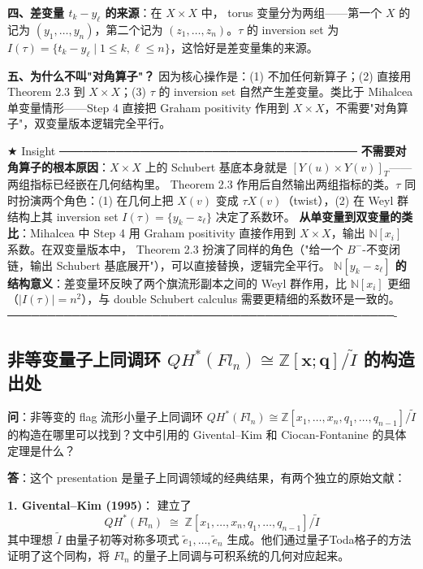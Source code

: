 \textbf{四、差变量 $t_k - y_\ell$ 的来源}：在 $X \times X$ 中， torus 变量分为两组——第一个 $X$ 的记为 $(y_1,\ldots,y_n)$，第二个记为 $(z_1,\ldots,z_n)$。$\tau$ 的 inversion set 为 $I(\tau) = \{t_k - y_\ell \mid 1 \leq k,\ell \leq n\}$，这恰好是差变量集的来源。

\textbf{五、为什么不叫"对角算子"？} 因为核心操作是：(1) 不加任何新算子；(2) 直接用 \cite{GX2025} Theorem 2.3 到 $X \times X$；(3) $\tau$ 的 inversion set 自然产生差变量。类比于 Mihalcea 单变量情形——Step 4 直接把 Graham positivity 作用到 $X \times X$，不需要"对角算子"，双变量版本逻辑完全平行。

★ Insight ─────────────────────────────────────
\textbf{不需要对角算子的根本原因}：$X \times X$ 上的 Schubert 基底本身就是 $[Y(u)\times Y(v)]_T$——两组指标已经嵌在几何结构里。\cite{GX2025} Theorem 2.3 作用后自然输出两组指标的类。$\tau$ 同时扮演两个角色：(1) 在几何上把 $X(v)$ 变成 $\tau X(v)$（twist），(2) 在 Weyl 群结构上其 inversion set $I(\tau) = \{y_k-z_\ell\}$ 决定了系数环。
\textbf{从单变量到双变量的类比}：Mihalcea 中 Step 4 用 Graham positivity 直接作用到 $X \times X$，输出 $\mathbb{N}[x_i]$ 系数。在双变量版本中，\cite{GX2025} Theorem 2.3 扮演了同样的角色（"给一个 $B^-$-不变闭链，输出 Schubert 基底展开"），可以直接替换，逻辑完全平行。
\textbf{$\mathbb{N}[y_k-z_\ell]$ 的结构意义}：差变量环反映了两个旗流形副本之间的 Weyl 群作用，比 $\mathbb{N}[x_i]$ 更细（$|I(\tau)| = n^2$），与 double Schubert calculus 需要更精细的系数环是一致的。
────────────────────────────────────────────────-

\subsection{非等变量子上同调环 $QH^*(Fl_n) \cong \mathbb{Z}[\mathbf{x};\mathbf{q}]/\widetilde{I}$ 的构造出处}\label{sec:qa-QH-Fln-construction}
\textbf{问}：非等变的 flag 流形小量子上同调环 $QH^*(Fl_n) \cong \mathbb{Z}[x_1,\ldots,x_n,q_1,\ldots,q_{n-1}]/\widetilde{I}$ 的构造在哪里可以找到？文中引用的 Givental--Kim 和 Ciocan-Fontanine 的具体定理是什么？

\textbf{答}：这个 presentation 是量子上同调领域的经典结果，有两个独立的原始文献：

\textbf{1. Givental--Kim (1995)}：\cite[ Theorem, p.610]{GiventalKim1995} 建立了
$$QH^*(Fl_n) \;\cong\; \mathbb{Z}[x_1,\ldots,x_n,q_1,\ldots,q_{n-1}]/\widetilde{I}$$
其中理想 $\widetilde{I}$ 由量子初等对称多项式 $\widetilde{e}_1,\ldots,\widetilde{e}_n$ 生成。他们通过量子Toda格子的方法证明了这个同构，将 $Fl_n$ 的量子上同调与可积系统的几何对应起来。

